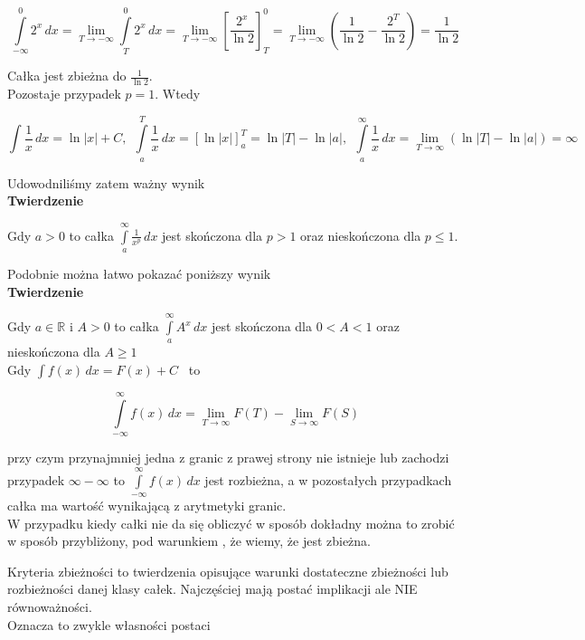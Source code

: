 \documentclass[12pt]{article}
\begin{document}
$$ \int\limits_{-\infty}^{0} 2^x \,dx = \lim_{T \to -\infty} \int\limits_{T}^{0} 2^x \,dx = 
\lim_{T \to -\infty} \left[ \frac{2^x}{\ln 2} \right]_T^0 = \lim_{T \to -\infty} 
\left( \frac{1}{\ln 2} - \frac{2^T}{\ln 2} \right) = \frac{1}{\ln 2} $$

Całka jest zbieżna do $ \frac{1}{\ln 2} $. \\

Pozostaje przypadek $ p = 1 $. Wtedy

$$ \int \frac{1}{x} \,dx = \ln |x| + C, \ \
\int\limits_{a}^{T} \frac{1}{x} \,dx = [\ln |x|]_a^T = \ln |T| - \ln |a|, \ \
\int\limits_{a}^{\infty} \frac{1}{x} \,dx = \lim_{T \to \infty} (\ln |T| - \ln |a|) = \infty $$

Udowodniliśmy zatem ważny wynik \\

\textbf{Twierdzenie} 

Gdy $ a > 0 $ to całka $ \int\limits_{a}^{\infty} \frac{1}{x^p} \,dx $
jest skończona dla $ p > 1 $ oraz nieskończona dla $ p \leq 1 $.

Podobnie można łatwo pokazać poniższy wynik \\

\textbf{Twierdzenie}

Gdy $ a \in \mathbb{R} $ i $ A > 0 $ to całka $ \int\limits_{a}^{\infty} A^x \,dx $
jest skończona dla $ 0 < A < 1 $ oraz nieskończona \linebreak dla $ A \geq 1 $ \\

Gdy $ \int f(x) \,dx = F(x) + C $ \ to

$$ \int\limits_{-\infty}^{\infty} f(x) \, dx = \lim_{T \to \infty} F(T) - \lim_{S \to \infty} F(S) $$

przy czym przynajmniej jedna z granic z prawej strony nie istnieje lub zachodzi przypadek 
$ \infty - \infty $ to $ \int\limits_{-\infty}^{\infty} f(x) \,dx $ jest rozbieżna, a w pozostałych
przypadkach całka ma wartość wynikającą z arytmetyki granic. \\

W przypadku kiedy całki nie da się obliczyć w sposób dokładny można to zrobić w sposób przybliżony, pod warunkiem
, że wiemy, że jest zbieżna.

Kryteria zbieżności to twierdzenia opisujące warunki dostateczne zbieżności lub rozbieżności danej klasy
całek. Najczęściej mają postać implikacji ale NIE równoważności. \\

Oznacza to zwykle własności postaci
\end{document}
